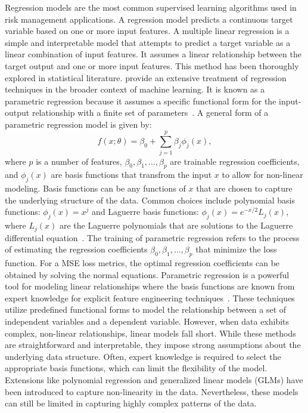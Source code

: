 Regression models are the most common supervised learning algorithms used in risk management applications.
A regression model predicts a continuous target variable based on one or more input features.
A multiple linear regression is a simple and interpretable model that attempts to predict a target variable as a linear combination of input features. 
It assumes a linear relationship between the target output and one or more input features. 
This method has been thoroughly explored in statistical literature. 
\citet{bishop2006pattern} provide an extensive treatment of regression techniques in the broader context of machine learning.
It is known as a parametric regression because it assumes a specific functional form for the input-output relationship with a finite set of parameters~\citep{seber2012linear}.
A general form of a parametric regression model is given by:
\begin{equation} \label{eq:regression}
    f(x; \theta) = \beta_0 + \sum_{j=1}^{p} \beta_j \phi_j(x),
\end{equation}
where $p$ is a number of features, $\beta_0, \beta_1, \ldots, \beta_p$ are trainable regression coefficients, and $\phi_j(x)$ are basis functions that transfrom the input $x$ to allow for non-linear modeling.
Basis functions can be any functions of $x$ that are chosen to capture the underlying structure of the data.
Common choices include polynomial basis functions: $\phi_j(x) = x^j$ and Laguerre basis functions: $\phi_j(x) = e^{-x/2} L_j(x)$, where $L_j(x)$ are the Laguerre polynomials that are solutions to the Laguerre differential equation~\citep{szeg1939orthogonal}.
The training of parametric regression refers to the process of estimating the regression coefficients $\beta_0, \beta_1, \ldots, \beta_p$ that minimize the loss function.
For a MSE loss metrics, the optimal regression coefficients can be obtained by solving the normal equations.
Parametric regression is a powerful tool for modeling linear relationships where the basis functions are known from expert knowledge for explicit feature engineering techniques~\citep{hastie2009elements}.
These techniques utilize predefined functional forms to model the relationship between a set of independent variables and a dependent variable. 
However, when data exhibits complex, non-linear relationships, linear models fall short. 
While these methods are straightforward and interpretable, they impose strong assumptions about the underlying data structure.
Often, expert knowledge is required to select the appropriate basis functions, which can limit the flexibility of the model.
Extensions like polynomial regression and generalized linear models (GLMs) have been introduced to capture non-linearity in the data.
Nevertheless, these models can still be limited in capturing highly complex patterns of the data. 

